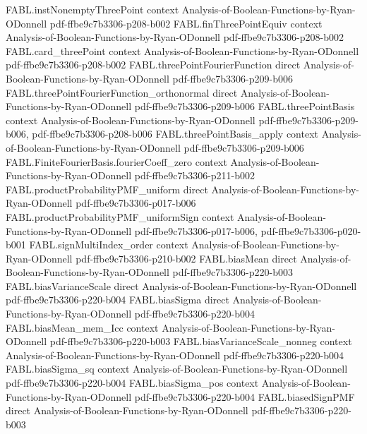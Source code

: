\begin{theorem}
\proofstep
  {FABL.instNonemptyThreePoint}
  {context}
  {Analysis-of-Boolean-Functions-by-Ryan-ODonnell}
  {pdf-ffbe9c7b3306-p208-b002}
\proofstep
  {FABL.finThreePointEquiv}
  {context}
  {Analysis-of-Boolean-Functions-by-Ryan-ODonnell}
  {pdf-ffbe9c7b3306-p208-b002}
\proofstep
  {FABL.card_threePoint}
  {context}
  {Analysis-of-Boolean-Functions-by-Ryan-ODonnell}
  {pdf-ffbe9c7b3306-p208-b002}
\proofstep
  {FABL.threePointFourierFunction}
  {direct}
  {Analysis-of-Boolean-Functions-by-Ryan-ODonnell}
  {pdf-ffbe9c7b3306-p209-b006}
\proofstep
  {FABL.threePointFourierFunction_orthonormal}
  {direct}
  {Analysis-of-Boolean-Functions-by-Ryan-ODonnell}
  {pdf-ffbe9c7b3306-p209-b006}
\proofstep
  {FABL.threePointBasis}
  {context}
  {Analysis-of-Boolean-Functions-by-Ryan-ODonnell}
  {pdf-ffbe9c7b3306-p209-b006,
    pdf-ffbe9c7b3306-p208-b006}
\proofstep
  {FABL.threePointBasis_apply}
  {context}
  {Analysis-of-Boolean-Functions-by-Ryan-ODonnell}
  {pdf-ffbe9c7b3306-p209-b006}
\proofstep
  {FABL.FiniteFourierBasis.fourierCoeff_zero}
  {context}
  {Analysis-of-Boolean-Functions-by-Ryan-ODonnell}
  {pdf-ffbe9c7b3306-p211-b002}
\proofstep
  {FABL.productProbabilityPMF_uniform}
  {direct}
  {Analysis-of-Boolean-Functions-by-Ryan-ODonnell}
  {pdf-ffbe9c7b3306-p017-b006}
\proofstep
  {FABL.productProbabilityPMF_uniformSign}
  {context}
  {Analysis-of-Boolean-Functions-by-Ryan-ODonnell}
  {pdf-ffbe9c7b3306-p017-b006,
    pdf-ffbe9c7b3306-p020-b001}
\proofstep
  {FABL.signMultiIndex_order}
  {context}
  {Analysis-of-Boolean-Functions-by-Ryan-ODonnell}
  {pdf-ffbe9c7b3306-p210-b002}
\proofstep
  {FABL.biasMean}
  {direct}
  {Analysis-of-Boolean-Functions-by-Ryan-ODonnell}
  {pdf-ffbe9c7b3306-p220-b003}
\proofstep
  {FABL.biasVarianceScale}
  {direct}
  {Analysis-of-Boolean-Functions-by-Ryan-ODonnell}
  {pdf-ffbe9c7b3306-p220-b004}
\proofstep
  {FABL.biasSigma}
  {direct}
  {Analysis-of-Boolean-Functions-by-Ryan-ODonnell}
  {pdf-ffbe9c7b3306-p220-b004}
\proofstep
  {FABL.biasMean_mem_Icc}
  {context}
  {Analysis-of-Boolean-Functions-by-Ryan-ODonnell}
  {pdf-ffbe9c7b3306-p220-b003}
\proofstep
  {FABL.biasVarianceScale_nonneg}
  {context}
  {Analysis-of-Boolean-Functions-by-Ryan-ODonnell}
  {pdf-ffbe9c7b3306-p220-b004}
\proofstep
  {FABL.biasSigma_sq}
  {context}
  {Analysis-of-Boolean-Functions-by-Ryan-ODonnell}
  {pdf-ffbe9c7b3306-p220-b004}
\proofstep
  {FABL.biasSigma_pos}
  {context}
  {Analysis-of-Boolean-Functions-by-Ryan-ODonnell}
  {pdf-ffbe9c7b3306-p220-b004}
\proofstep
  {FABL.biasedSignPMF}
  {direct}
  {Analysis-of-Boolean-Functions-by-Ryan-ODonnell}
  {pdf-ffbe9c7b3306-p220-b003}

\end{theorem}

